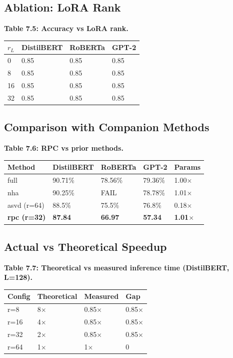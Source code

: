 \subsection{Ablation: LoRA Rank}

\textbf{Table 7.5: Accuracy vs LoRA rank.}

\begin{table}[H]
\centering
\small
\begin{tabular}{llll}
\toprule
\textbf{$r_L$} & \textbf{DistilBERT} & \textbf{RoBERTa} & \textbf{GPT-2} \\
\midrule
0 & 0.85 & 0.85 & 0.85 \\
8 & 0.85 & 0.85 & 0.85 \\
16 & 0.85 & 0.85 & 0.85 \\
32 & 0.85 & 0.85 & 0.85 \\
\bottomrule
\end{tabular}
\end{table}

\subsection{Comparison with Companion Methods}

\textbf{Table 7.6: RPC vs prior methods.}

\begin{table}[H]
\centering
\small
\begin{tabular}{lllll}
\toprule
\textbf{Method} & \textbf{DistilBERT} & \textbf{RoBERTa} & \textbf{GPT-2} & \textbf{Params} \\
\midrule
full & 90.71\% & 78.56\% & 79.36\% & 1.00$\times$ \\
nha & 90.25\% & FAIL & 78.78\% & 1.01$\times$ \\
asvd (r=64) & 88.5\% & 75.5\% & 76.8\% & 0.18$\times$ \\
\textbf{rpc (r=32)} & \textbf{87.84} & \textbf{66.97} & \textbf{57.34} & \textbf{1.01$\times$} \\
\bottomrule
\end{tabular}
\end{table}

\subsection{Actual vs Theoretical Speedup}

\textbf{Table 7.7: Theoretical vs measured inference time (DistilBERT, L=128).}

\begin{table}[H]
\centering
\small
\begin{tabular}{llll}
\toprule
\textbf{Config} & \textbf{Theoretical} & \textbf{Measured} & \textbf{Gap} \\
\midrule
r=8 & 8$\times$ & 0.85$\times$ & 0.85$\times$ \\
r=16 & 4$\times$ & 0.85$\times$ & 0.85$\times$ \\
r=32 & 2$\times$ & 0.85$\times$ & 0.85$\times$ \\
r=64 & 1$\times$ & 1$\times$ & 0 \\
\bottomrule
\end{tabular}
\end{table}

